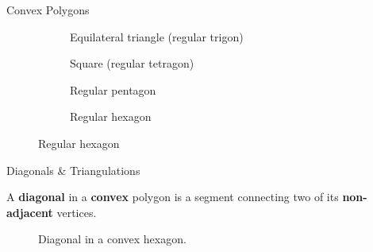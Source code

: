 \documentclass[final]{beamer}
\newlength{\colwidth}
\newcommand{\bfalert}[1]{\textbf{\alert{#1}}}
\begin{document}
\begin{frame}[t]
\begin{columns}[t]
\begin{column}{\colwidth}
\begin{block}{Convex Polygons}
\begin{figure}[H]
\begin{subfigure}[t]{.24\textwidth}
     \caption*{Equilateral triangle (regular trigon)}
    \end{subfigure}
    \begin{subfigure}[t]{.24\textwidth}
     \centering
     \caption*{Square (regular tetragon)}
    \end{subfigure}
    \begin{subfigure}[t]{.24\textwidth}
     \centering
     \caption*{Regular pentagon}
    \end{subfigure}
    \begin{subfigure}[t]{.24\textwidth}
     \centering
     \caption*{Regular hexagon}
    \end{subfigure}
   \end{figure}
  \end{block}

  \begin{exampleblock}{Diagonals \& Triangulations}

   A \bfalert{diagonal} in a \textbf{convex} polygon is a segment connecting two
   of its \textbf{non-adjacent} vertices.
   \begin{figure}[H]
    \centering
    \caption*{\textcolor{gevored}{Diagonal} in a convex hexagon.}
   \end{figure}


\end{exampleblock}
\end{column}
\end{columns}
\end{frame}
\end{document}
